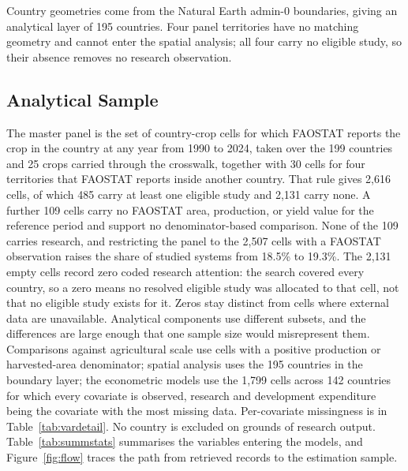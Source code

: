 \documentclass[ASNA,twocolumn]{USG}
\begin{document}
Country geometries come from the Natural Earth admin-0 boundaries, giving an analytical layer
of 195 countries. Four panel territories have no matching geometry and cannot enter the
spatial analysis; all four carry no eligible study, so their absence removes no research
observation.

\subsection{Analytical Sample}

The master panel is the set of country-crop cells for which FAOSTAT reports the crop in the
country at any year from 1990 to 2024, taken over the 199 countries and 25 crops carried through
the crosswalk, together with 30 cells for four territories that FAOSTAT reports inside another
country. That rule gives 2,616 cells, of which 485 carry at least one eligible study and 2,131
carry none. A further 109 cells carry no FAOSTAT area, production, or yield value for the reference period
and support no denominator-based comparison. None of the 109 carries research, and restricting
the panel to the 2,507 cells with a FAOSTAT observation raises the share of studied systems from
18.5\% to 19.3\%. The 2,131 empty cells record zero coded research attention: the
search covered every country, so a zero means no resolved eligible study was allocated to that
cell, not that no eligible study exists for it. Zeros stay distinct from cells where external
data are unavailable. Analytical
components use different subsets, and the differences are large enough that one sample size
would misrepresent them. Comparisons against agricultural scale use cells with a positive
production or harvested-area denominator; spatial analysis uses the 195 countries in the
boundary layer; the econometric models use the 1,799 cells across 142 countries for which
every covariate is observed, research and development expenditure being the covariate with the
most missing data. Per-covariate missingness is in Table~\ref{tab:vardetail}. No country is excluded on grounds of
research output. Table~\ref{tab:summstats} summarises the variables entering the models, and
Figure~\ref{fig:flow} traces the path from retrieved records to the estimation sample.
\end{document}

